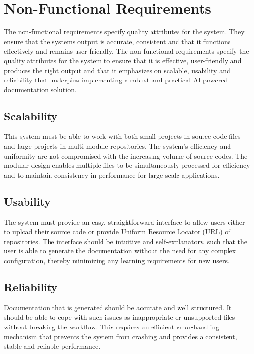 \section{Non-Functional Requirements}
\hspace{0.5cm}
The non-functional requirements specify quality attributes for the system. They ensure that the systems output is accurate, consistent and that it functions effectively and remains user-friendly. The non-functional requirements specify the quality attributes for the system to ensure that it is effective, user-friendly and produces the right output and that it emphasizes on scalable, usability and reliability that underpins implementing a robust and practical AI-powered documentation solution. 
\subsection{Scalability}
\hspace{0.5cm}This system must be able to work with both small projects in source code files and large projects in multi-module repositories. The system’s efficiency and uniformity are not compromised with the increasing volume of source codes. The modular design enables multiple files to be simultaneously processed for efficiency and to maintain consistency in performance for large-scale applications. 

\subsection{Usability}
\hspace{0.5cm}The system must provide an easy, straightforward interface to allow users either to upload their source code or provide Uniform Resource Locator (URL) of repositories. The interface should be intuitive and self-explanatory, such that the user is able to generate the documentation without the need for any complex configuration, thereby minimizing any learning requirements for new users.

\subsection{Reliability}
\hspace{0.5cm}Documentation that is generated should be accurate and well structured. It should be able to cope with such issues as inappropriate or unsupported files without breaking the workflow. This requires an efficient error-handling mechanism that prevents the system from crashing and provides a consistent, stable and reliable performance. 

